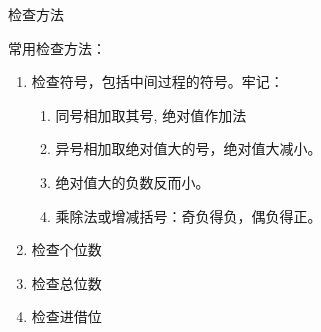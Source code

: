 \documentclass[aspectratio=169]{ctexbeamer} %
\date{\today}
\begin{document}
\begin{frame}[t]{检查方法}
\begin{spacing}{1.2}
\normalsize
\alert{常用检查方法：}
\begin{enumerate}[label={\arabic*.}]
\item 检查符号，包括中间过程的符号。牢记：
	\begin{enumerate}[label={\alph*.}]
	\item 同号相加取其号, 绝对值作加法
	\item 异号相加取绝对值大的号，绝对值大减小。
	\item 绝对值大的负数反而小。
	\item 乘除法或增减括号：奇负得负，偶负得正。
	\end{enumerate}
\item 检查个位数
\item 检查总位数
\item 检查进借位

\end{enumerate}

\end{spacing}
\end{frame}
\end{document}
